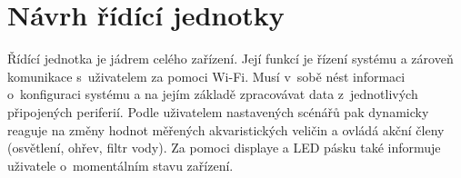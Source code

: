\chapter{Návrh řídící jednotky}
    Řídící jednotka je jádrem celého zařízení. Její funkcí je řízení systému a zároveň komunikace s~uživatelem za pomoci Wi-Fi. Musí v~sobě nést informaci o~konfiguraci systému a na jejím základě zpracovávat data z~jednotlivých připojených periferií. Podle uživatelem nastavených scénářů pak dynamicky reaguje na změny hodnot měřených akvaristických veličin a ovládá akční členy (osvětlení, ohřev, filtr vody). Za pomoci displaye a LED pásku také informuje uživatele o~momentálním stavu zařízení. 

    

    \clearpage
    
    

            
